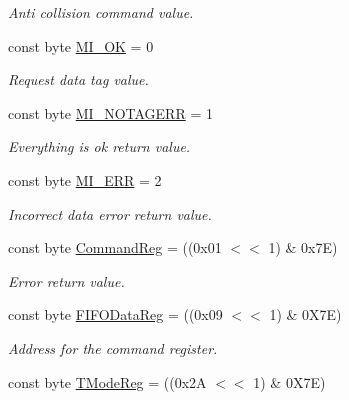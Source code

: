 \begin{DoxyCompactItemize}
\begin{DoxyCompactList}\small\item\em Anti collision command value. \end{DoxyCompactList}\item 
const byte \hyperlink{classmfrc522_ae9691458db3d46de5632ef531c0a06bc}{M\+I\+\_\+\+OK} = 0\hypertarget{classmfrc522_ae9691458db3d46de5632ef531c0a06bc}{}\label{classmfrc522_ae9691458db3d46de5632ef531c0a06bc}

\begin{DoxyCompactList}\small\item\em Request data tag value. \end{DoxyCompactList}\item 
const byte \hyperlink{classmfrc522_abcdae51991b17be0222a25c351f36c08}{M\+I\+\_\+\+N\+O\+T\+A\+G\+E\+RR} = 1\hypertarget{classmfrc522_abcdae51991b17be0222a25c351f36c08}{}\label{classmfrc522_abcdae51991b17be0222a25c351f36c08}

\begin{DoxyCompactList}\small\item\em Everything is ok return value. \end{DoxyCompactList}\item 
const byte \hyperlink{classmfrc522_a6a308a9c089dea6dbab9366fc939c313}{M\+I\+\_\+\+E\+RR} = 2\hypertarget{classmfrc522_a6a308a9c089dea6dbab9366fc939c313}{}\label{classmfrc522_a6a308a9c089dea6dbab9366fc939c313}

\begin{DoxyCompactList}\small\item\em Incorrect data error return value. \end{DoxyCompactList}\item 
const byte \hyperlink{classmfrc522_abc418205b4d996c1541bfda1ce89c196}{Command\+Reg} = ((0x01 $<$$<$ 1) \& 0x7\+E)\hypertarget{classmfrc522_abc418205b4d996c1541bfda1ce89c196}{}\label{classmfrc522_abc418205b4d996c1541bfda1ce89c196}

\begin{DoxyCompactList}\small\item\em Error return value. \end{DoxyCompactList}\item 
const byte \hyperlink{classmfrc522_aa1dd9bd0fb405bc8217cc6c655c0b434}{F\+I\+F\+O\+Data\+Reg} = ((0x09 $<$$<$ 1) \& 0\+X7\+E)\hypertarget{classmfrc522_aa1dd9bd0fb405bc8217cc6c655c0b434}{}\label{classmfrc522_aa1dd9bd0fb405bc8217cc6c655c0b434}

\begin{DoxyCompactList}\small\item\em Address for the command register. \end{DoxyCompactList}\item 
const byte \hyperlink{classmfrc522_ab4ce527983527c3db68f7541cb6b62fc}{T\+Mode\+Reg} = ((0x2\+A $<$$<$ 1) \& 0\+X7\+E)\hypertarget{classmfrc522_ab4ce527983527c3db68f7541cb6b62fc}{}\label{classmfrc522_ab4ce527983527c3db68f7541cb6b62fc}


\end{DoxyCompactItemize}
